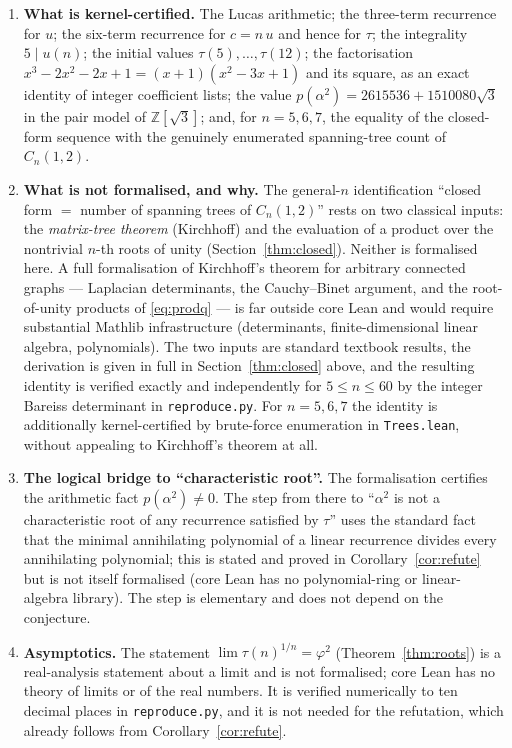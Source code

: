 \documentclass[11pt]{article}
\theoremstyle{definition}
\theoremstyle{remark}
\newcommand{\Z}{\mathbb{Z}}
\newcommand{\tauc}{\tau}
\begin{document}
\begin{enumerate}
\item \textbf{What is kernel-certified.}  The Lucas arithmetic; the three-term
recurrence for $u$; the six-term recurrence for $c = n\,u$ and hence for
$\tauc$; the integrality $5 \mid u(n)$; the initial values
$\tauc(5),\dots,\tauc(12)$; the factorisation
$x^{3}-2x^{2}-2x+1 = (x+1)(x^{2}-3x+1)$ and its square, as an exact identity of
integer coefficient lists; the value $p(\alpha^{2}) = 2615536 + 1510080\sqrt3$ in
the pair model of $\Z[\sqrt3]$; and, for $n = 5,6,7$, the equality of the
closed-form sequence with the genuinely enumerated spanning-tree count of
$C_n(1,2)$.

\item \textbf{What is not formalised, and why.}  The general-$n$ identification
``closed form $=$ number of spanning trees of $C_n(1,2)$'' rests on two
classical inputs: the \emph{matrix-tree theorem} (Kirchhoff) and the evaluation
of a product over the nontrivial $n$-th roots of unity
(Section~\ref{thm:closed}).  Neither is formalised here.  A full formalisation of
Kirchhoff's theorem for arbitrary connected graphs --- Laplacian determinants,
the Cauchy--Binet argument, and the root-of-unity products of
\eqref{eq:prodq} --- is far outside core Lean and would require substantial
Mathlib infrastructure (determinants, finite-dimensional linear algebra,
polynomials).  The two inputs are standard textbook results, the derivation is
given in full in Section~\ref{thm:closed} above, and the resulting identity is
verified exactly and independently for $5 \le n \le 60$ by the integer
Bareiss determinant in \texttt{reproduce.py}.  For $n = 5,6,7$ the identity is
additionally kernel-certified by brute-force enumeration in \texttt{Trees.lean},
without appealing to Kirchhoff's theorem at all.

\item \textbf{The logical bridge to ``characteristic root''.}  The formalisation
certifies the arithmetic fact $p(\alpha^{2}) \neq 0$.  The step from there to
``$\alpha^{2}$ is not a characteristic root of any recurrence satisfied by
$\tauc$'' uses the standard fact that the minimal annihilating polynomial of a
linear recurrence divides every annihilating polynomial; this is stated and
proved in Corollary~\ref{cor:refute} but is not itself formalised (core Lean has
no polynomial-ring or linear-algebra library).  The step is elementary and does
not depend on the conjecture.

\item \textbf{Asymptotics.}  The statement $\lim \tauc(n)^{1/n} = \varphi^{2}$
(Theorem~\ref{thm:roots}) is a real-analysis statement about a limit and is not
formalised; core Lean has no theory of limits or of the real numbers.  It is
verified numerically to ten decimal places in \texttt{reproduce.py}, and it is
not needed for the refutation, which already follows from
Corollary~\ref{cor:refute}.
\end{enumerate}
\end{document}
